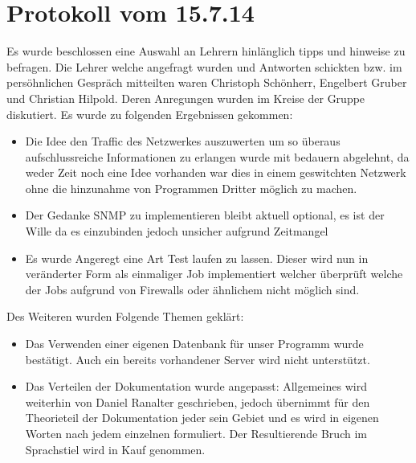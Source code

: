 \documentclass[10pt,a4paper]{report}
\begin{document}
\chapter{Protokoll vom 15.7.14}
Es wurde beschlossen eine Auswahl an Lehrern hinlänglich tipps und hinweise zu befragen. Die Lehrer welche angefragt wurden und Antworten schickten bzw. im persöhnlichen Gespräch mitteilten waren Christoph Schönherr, Engelbert Gruber und Christian Hilpold. Deren Anregungen wurden im Kreise der Gruppe diskutiert. Es wurde zu folgenden Ergebnissen gekommen:
\begin{itemize}
\item Die Idee den Traffic des Netzwerkes auszuwerten um so überaus aufschlussreiche Informationen zu erlangen wurde mit bedauern abgelehnt, da weder Zeit noch eine Idee vorhanden war dies in einem geswitchten Netzwerk ohne die hinzunahme von Programmen Dritter möglich zu machen.
\item Der Gedanke SNMP zu implementieren bleibt aktuell optional, es ist der Wille da es einzubinden jedoch unsicher aufgrund Zeitmangel
\item Es wurde Angeregt eine Art Test laufen zu lassen. Dieser wird nun in veränderter Form als einmaliger Job implementiert welcher überprüft welche der Jobs aufgrund von Firewalls oder ähnlichem nicht möglich sind.
\end{itemize}
Des Weiteren wurden Folgende Themen geklärt:
\begin{itemize}
\item Das Verwenden einer eigenen Datenbank für unser Programm wurde bestätigt. Auch ein bereits vorhandener Server wird nicht unterstützt.
\item Das Verteilen der Dokumentation wurde angepasst: Allgemeines wird weiterhin von Daniel Ranalter geschrieben, jedoch übernimmt für den Theorieteil der Dokumentation jeder sein Gebiet und es wird in eigenen Worten nach jedem einzelnen formuliert. Der Resultierende Bruch im Sprachstiel wird in Kauf genommen. 
\end{itemize}
\end{document}
